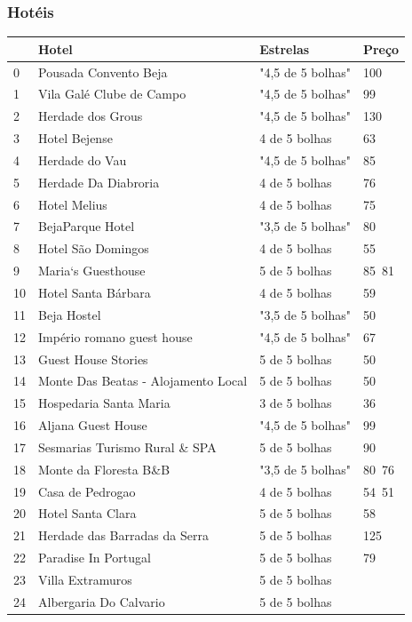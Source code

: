 \documentclass[a4paper,10pt]{article}
\begin{document}
\newpage

\subsubsection{Hotéis}

\begin{table}[!ht]
  \centering
  \begin{tabular}{|l|l|l|l|}
  \hline
      ~ & Hotel & Estrelas & Preço \\ \hline
      0 & Pousada Convento Beja & "4,5 de 5 bolhas" & 100 \\ \hline
      1 & Vila Galé Clube de Campo & "4,5 de 5 bolhas" & 99 \\ \hline
      2 & Herdade dos Grous & "4,5 de 5 bolhas" & 130 \\ \hline
      3 & Hotel Bejense & 4 de 5 bolhas & 63 \\ \hline
      4 & Herdade do Vau & "4,5 de 5 bolhas" & 85 \\ \hline
      5 & Herdade Da Diabroria & 4 de 5 bolhas & 76 \\ \hline
      6 & Hotel Melius & 4 de 5 bolhas & 75 \\ \hline
      7 & BejaParque Hotel & "3,5 de 5 bolhas" & 80 \\ \hline
      8 & Hotel São Domingos & 4 de 5 bolhas & 55 \\ \hline
      9 & Maria`s Guesthouse & 5 de 5 bolhas & 85 81 \\ \hline
      10 & Hotel Santa Bárbara & 4 de 5 bolhas & 59 \\ \hline
      11 & Beja Hostel & "3,5 de 5 bolhas" & 50 \\ \hline
      12 & Império romano guest house & "4,5 de 5 bolhas" & 67 \\ \hline
      13 & Guest House Stories & 5 de 5 bolhas & 50 \\ \hline
      14 & Monte Das Beatas - Alojamento Local & 5 de 5 bolhas & 50 \\ \hline
      15 & Hospedaria Santa Maria & 3 de 5 bolhas & 36 \\ \hline
      16 & Aljana Guest House & "4,5 de 5 bolhas" & 99 \\ \hline
      17 & Sesmarias Turismo Rural \& SPA & 5 de 5 bolhas & 90 \\ \hline
      18 & Monte da Floresta B\&B & "3,5 de 5 bolhas" & 80 76 \\ \hline
      19 & Casa de Pedrogao & 4 de 5 bolhas & 54 51 \\ \hline
      20 & Hotel Santa Clara & 5 de 5 bolhas & 58 \\ \hline
      21 & Herdade das Barradas da Serra & 5 de 5 bolhas & 125 \\ \hline
      22 & Paradise In Portugal & 5 de 5 bolhas & 79 \\ \hline
      23 & Villa Extramuros & 5 de 5 bolhas & ~ \\ \hline
      24 & Albergaria Do Calvario & 5 de 5 bolhas & ~ \\ \hline
  \end{tabular}
\end{table}
\end{document}
